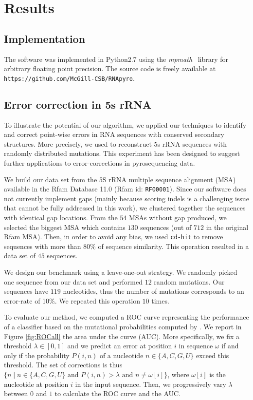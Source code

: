 \section{Results}
\label{sec:results}

\subsection{Implementation}
The software was implemented in Python2.7 using the \textit{mpmath}~\cite{mpmath} library
for  arbitrary floating point precision. The source code is freely available at \verb+https://github.com/McGill-CSB/RNApyro+.



\subsection{Error correction in 5s rRNA}

To illustrate the potential of our algorithm, we applied our techniques to identify and correct point-wise errors in RNA sequences
with conserved secondary structures. More precisely, we used \RNApyro to reconstruct 5s rRNA sequences with randomly distributed
mutations. This experiment has been designed to suggest further applications to error-corrections in pyrosequencing data.

We build our data set from the 5S rRNA multiple sequence alignment (MSA) available in the Rfam Database 11.0 (Rfam id: \texttt{RF00001}).
Since our software does not currently implement gaps (mainly because scoring indels is a challenging issue that cannot be fully addressed
in this work),  we clustered together the sequences with identical gap locations. From the $54$ MSAs without gap produced, we selected the
biggest MSA  which contains $130$ sequences (out of $712$ in the original Rfam MSA). Then, in order to avoid any bias, we used \texttt{cd-hit}
\cite{Li:2006fk} to remove sequences with more than 80\% of sequence similarity. This operation resulted in a data set of $45$ sequences. 

We design our benchmark using a leave-one-out strategy. We randomly picked one sequence from our data set and performed $12$ random
mutations. Our sequences have $119$ nucleotides, thus the number of mutations corresponds to an error-rate of 10\%. We repeated this operation 
$10$ times. 

To evaluate our method, we computed a ROC curve representing the performance of a classifier based on the mutational probabilities computed by
\RNApyro. We report in Figure \ref{fig:ROCall} the area under the curve (AUC). More specifically, we fix a threshold $\lambda \in [0,1]$ and we
predict an error at position $i$ in sequence $\omega$ if and only if the probability $P(i,n)$ of a nucleotide $n \in \{ A,C,G,U \}$ exceed this threshold.
The set of corrections is thus $\{ n \; | \;  n \in \{ A,C,G,U \} \mbox{ and } P(i,n) > \lambda \mbox{ and }  n \neq \omega[i] \}$, where $\omega[i]$ is the
nucleotide at position $i$ in the input sequence. Then, we progressively vary $\lambda$ between $0$ and $1$ to calculate the ROC curve and the AUC.



